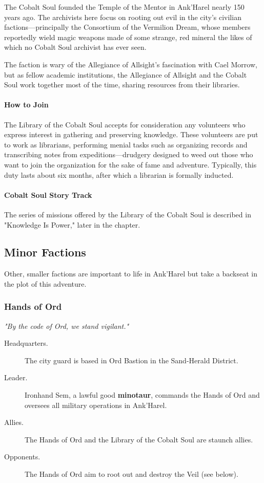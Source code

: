 \documentclass[a4paper, 11pt, bg=full, twocolumn, nooutline]{dndbook}
\begin{document}
The Cobalt Soul founded the Temple of the Mentor in Ank'Harel nearly 150 years ago. The archivists here focus on rooting out evil in the city's civilian factions---principally the Consortium of the Vermilion Dream, whose members reportedly wield magic weapons made of some strange, red mineral the likes of which no Cobalt Soul archivist has ever seen.

The faction is wary of the Allegiance of Allsight's fascination with Cael Morrow, but as fellow academic institutions, the Allegiance of Allsight and the Cobalt Soul work together most of the time, sharing resources from their libraries.

\paragraph{How to Join}

The Library of the Cobalt Soul accepts for consideration any volunteers who express interest in gathering and preserving knowledge. These volunteers are put to work as librarians, performing menial tasks such as organizing records and transcribing notes from expeditions---drudgery designed to weed out those who want to join the organization for the sake of fame and adventure. Typically, this duty lasts about six months, after which a librarian is formally inducted.

\paragraph{Cobalt Soul Story Track}

The series of missions offered by the Library of the Cobalt Soul is described in "Knowledge Is Power," later in the chapter.

\subsection{Minor Factions}

Other, smaller factions are important to life in Ank'Harel but take a backseat in the plot of this adventure.

\subsubsection{Hands of Ord}

\textit{"By the code of Ord, we stand vigilant."}

\begin{description}
\item[Headquarters.] The city guard is based in Ord Bastion in the Sand-Herald District.
\item[Leader.] Ironhand Sem, a lawful good \textbf{minotaur}, commands the Hands of Ord and oversees all military operations in Ank'Harel.
\item[Allies.] The Hands of Ord and the Library of the Cobalt Soul are staunch allies.
\item[Opponents.] The Hands of Ord aim to root out and destroy the Veil (see below).
\end{description}
\end{document}
